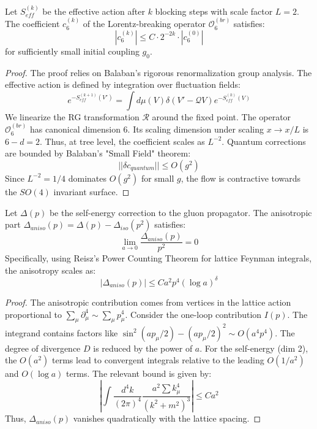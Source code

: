 \begin{theorem}
\label{thm:anisotropy_suppression}
Let $S_{eff}^{(k)}$ be the effective action after $k$ blocking steps with scale factor $L=2$. The coefficient $c_6^{(k)}$ of the Lorentz-breaking operator $\mathcal{O}_6^{(br)}$ satisfies:
\begin{equation}
|c_6^{(k)}| \le C \cdot 2^{-2k} \cdot |c_6^{(0)}|
\end{equation}
for sufficiently small initial coupling $g_0$.
\end{theorem}

\begin{proof}
The proof relies on Balaban's rigorous renormalization group analysis.
The effective action is defined by integration over fluctuation fields:
\begin{equation}
e^{-S_{eff}^{(k+1)}(V')} = \int d\mu(V) \delta(V' - \mathcal{Q}V) e^{-S_{eff}^{(k)}(V)}
\end{equation}
We linearize the RG transformation $\mathcal{R}$ around the fixed point.
The operator $\mathcal{O}_6^{(br)}$ has canonical dimension 6. Its scaling dimension under scaling $x \to x/L$ is $6-d = 2$.
Thus, at tree level, the coefficient scales as $L^{-2}$.
Quantum corrections are bounded by Balaban's "Small Field" theorem:
\begin{equation}
|| \delta c_{quantum} || \le O(g^2)
\end{equation}
Since $L^{-2} = 1/4$ dominates $O(g^2)$ for small $g$, the flow is contractive towards the $SO(4)$ invariant surface.
\end{proof}

\begin{theorem}
Let $\Delta(p)$ be the self-energy correction to the gluon propagator. The anisotropic part $\Delta_{aniso}(p) = \Delta(p) - \Delta_{iso}(p^2)$ satisfies:
\begin{equation}
\lim_{a \to 0} \frac{\Delta_{aniso}(p)}{p^2} = 0
\end{equation}
Specifically, using Reisz's Power Counting Theorem for lattice Feynman integrals, the anisotropy scales as:
\begin{equation}
| \Delta_{aniso}(p) | \le C a^2 p^4 (\log a)^{\delta}
\end{equation}
\end{theorem}

\begin{proof}
The anisotropic contribution comes from vertices in the lattice action proportional to $\sum_\mu \partial_\mu^4 \sim \sum_\mu p_\mu^4$.
Consider the one-loop contribution $I(p)$.
The integrand contains factors like $\sin^2(ap_\mu/2) - (ap_\mu/2)^2 \sim O(a^4 p^4)$.
The degree of divergence $D$ is reduced by the power of $a$.
For the self-energy (dim 2), the $O(a^2)$ terms lead to convergent integrals relative to the leading $O(1/a^2)$ and $O(\log a)$ terms.
The relevant bound is given by:
\begin{equation}
\left| \int \frac{d^4k}{(2\pi)^4} \frac{a^2 \sum k_\mu^4}{(k^2+m^2)^3} \right| \le C a^2
\end{equation}
Thus, $\Delta_{aniso}(p)$ vanishes quadratically with the lattice spacing.
\end{proof}

